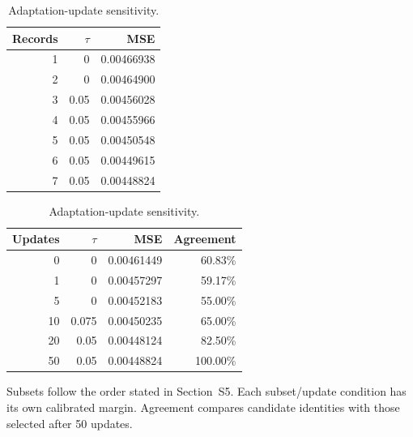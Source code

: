 \begin{table}[!htbp]
\centering\footnotesize
\begin{minipage}[t]{.43\linewidth}
\centering
\caption{Nested candidate-subset sensitivity.}\label{tab:s-bankcurve}
\begin{tabular}{rrr}
\toprule Records & $\tau$ & MSE\\\midrule
1 & 0 & 0.00466938\\
2 & 0 & 0.00464900\\
3 & 0.05 & 0.00456028\\
4 & 0.05 & 0.00455966\\
5 & 0.05 & 0.00450548\\
6 & 0.05 & 0.00449615\\
7 & 0.05 & 0.00448824\\
\bottomrule\end{tabular}
\end{minipage}\hfill
\begin{minipage}[t]{.53\linewidth}
\centering
\caption{Adaptation-update sensitivity.}\label{tab:s-updates}
\begin{tabular}{rrrr}
\toprule Updates & $\tau$ & MSE & Agreement\\\midrule
0 & 0 & 0.00461449 & 60.83\%\\
1 & 0 & 0.00457297 & 59.17\%\\
5 & 0 & 0.00452183 & 55.00\%\\
10 & 0.075 & 0.00450235 & 65.00\%\\
20 & 0.05 & 0.00448124 & 82.50\%\\
50 & 0.05 & 0.00448824 & 100.00\%\\
\bottomrule\end{tabular}
\end{minipage}
\par\vspace{4pt}\begin{minipage}{\linewidth}\footnotesize
Subsets follow the order stated in Section~S5. Each subset/update condition
has its own calibrated margin. Agreement compares candidate identities
with those selected after 50 updates.
\end{minipage}
\end{table}
